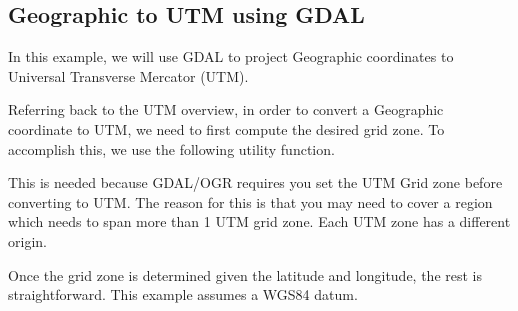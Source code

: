 %


\subsection*{Geographic to UTM using GDAL}

In this example, we will use GDAL to project Geographic coordinates to Universal Transverse
Mercator (UTM).  

Referring back to the UTM overview, in order to convert a Geographic coordinate
to UTM, we need to first compute the desired grid zone.  To accomplish this, we use
the following utility function. 



This is needed because GDAL/OGR requires you set the UTM Grid zone before converting to UTM.  
The reason for this is that you may need to cover a region which needs to span more than 1 UTM grid zone.
Each UTM zone has a different origin.

Once the grid zone is determined given the latitude and longitude, the rest is straightforward.  This example
assumes a WGS84 datum. 




